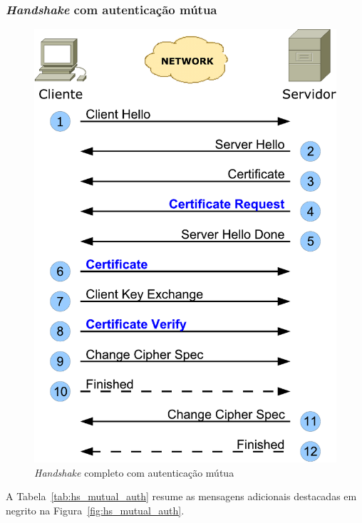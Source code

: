 \subsubsection{\emph{Handshake} com autenticação mútua}

\begin{figure}[htp]
    \centering
        \includegraphics[scale=0.5]{fig/hs_mutual_auth}
    \caption{\emph{Handshake} completo com autenticação mútua}
    \label{fig:hs_mutual_auth}
\end{figure}

A Tabela~\vref{tab:hs_mutual_auth} resume as mensagens adicionais destacadas em negrito na
Figura~\vref{fig:hs_mutual_auth}.

